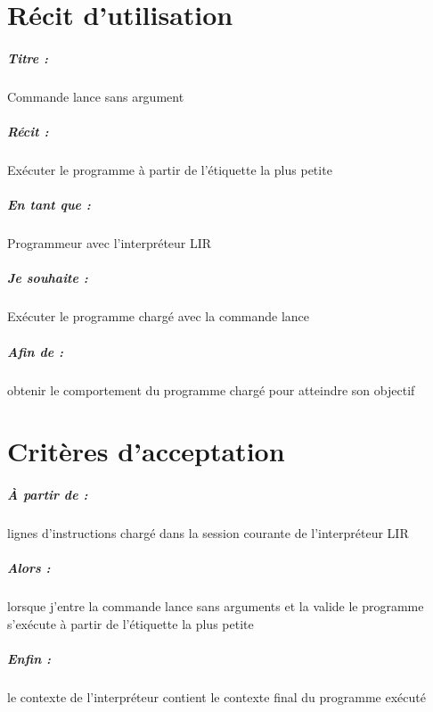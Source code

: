 \documentclass[12pt,a5paper, notitle, oneside]{report}
\begin{document}
    \chapter*{Récit d'utilisation}

    \paragraph{Titre : } Commande lance sans argument
    \paragraph{Récit : } Exécuter le programme à partir de l'étiquette la plus petite
    \paragraph{En tant que : } Programmeur avec l'interpréteur LIR
    \paragraph{Je souhaite : } Exécuter le programme chargé avec la commande lance
    \paragraph{Afin de : } obtenir le comportement du programme chargé pour atteindre son objectif
    \newpage

    \chapter*{Critères d'acceptation}

    \paragraph{À partir de : } lignes d'instructions chargé dans la session courante de l'interpréteur LIR
    \paragraph{Alors : } lorsque j'entre la commande lance sans arguments et la valide le programme s'exécute à 
                         partir de l'étiquette la plus petite
    \paragraph{Enfin : } le contexte de l'interpréteur contient le contexte final du programme exécuté
\end{document}
